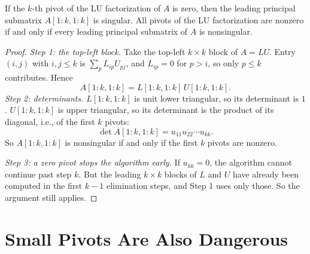 \begin{theorem}
  \label{thm:lu-exists}
  If the $k$-th pivot of the LU factorization of $A$ is zero, then the leading principal submatrix $A[1{:}k, 1{:}k]$ is singular. All pivots of the LU factorization are nonzero if and only if every leading principal submatrix of $A$ is nonsingular.
\end{theorem}

\begin{proof}
  \emph{Step 1: the top-left block.} Take the top-left $k \times k$ block of $A = LU$. Entry $(i, j)$ with $i, j \le k$ is $\sum_p L_{ip}U_{pj}$, and $L_{ip} = 0$ for $p > i$, so only $p \le k$ contributes. Hence
  \begin{equation}
    A[1{:}k, 1{:}k] = L[1{:}k, 1{:}k]\,U[1{:}k, 1{:}k].
  \end{equation}
  \emph{Step 2: determinants.} $L[1{:}k, 1{:}k]$ is unit lower triangular, so its determinant is $1$. $U[1{:}k, 1{:}k]$ is upper triangular, so its determinant is the product of its diagonal, i.e., of the first $k$ pivots:
  \begin{equation}
    \det A[1{:}k, 1{:}k] = u_{11}u_{22} \cdots u_{kk}.
  \end{equation}
  So $A[1{:}k, 1{:}k]$ is nonsingular if and only if the first $k$ pivots are nonzero.

  \emph{Step 3: a zero pivot stops the algorithm early.} If $u_{kk} = 0$, the algorithm cannot continue past step $k$. But the leading $k \times k$ blocks of $L$ and $U$ have already been computed in the first $k - 1$ elimination steps, and Step 1 uses only those. So the argument still applies.
\end{proof}

\section{Small Pivots Are Also Dangerous}


